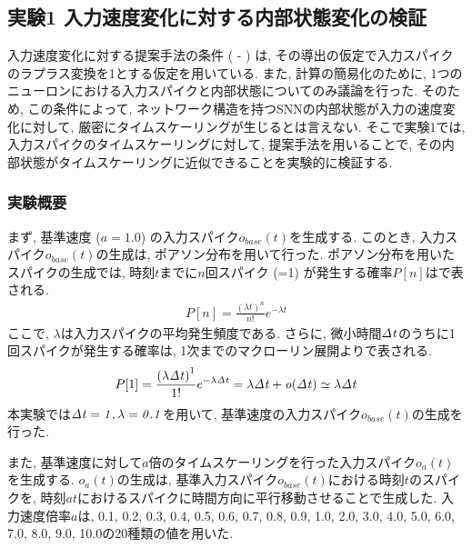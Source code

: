 \subsection{実験1 入力速度変化に対する内部状態変化の検証}

入力速度変化に対する提案手法の条件 ( - ) は, その導出の仮定で入力スパイクのラプラス変換を1とする仮定を用いている.
また, 計算の簡易化のために, 1つのニューロンにおける入力スパイクと内部状態についてのみ議論を行った.
そのため, この条件によって, ネットワーク構造を持つSNNの内部状態が入力の速度変化に対して, 厳密にタイムスケーリングが生じるとは言えない.
そこで実験1では, 入力スパイクのタイムスケーリングに対して, 提案手法を用いることで, その内部状態がタイムスケーリングに近似できることを実験的に検証する.


\subsubsection{実験概要}
まず, 基準速度 ($a=1.0$) の入力スパイク$o_{base}(t)$を生成する.
このとき, 入力スパイク$o_{base}(t)$の生成は, ポアソン分布を用いて行った.
ポアソン分布を用いたスパイクの生成では, 時刻$t$までに$n$回スパイク (=1) が発生する確率$P[n]$はで表される.
\begin{align}
    P[n] = \frac{\left(\lambda t\right)^n}{n!} e^{-\lambda t} \label{eq:poisson:distribution}
\end{align}
ここで, $\lambda$は入力スパイクの平均発生頻度である.
さらに, 微小時間$\it{\Delta} t$のうちに1回スパイクが発生する確率は, 1次までのマクローリン展開よりで表される.
\begin{align}
    P[1] = \frac{\left(\lambda \it{\Delta} t\right)^1}{1!} e^{-\lambda \it{\Delta} t} = \lambda \it{\Delta} t + o(\it{\Delta} t) \simeq \lambda \it{\Delta} t \label{eq:poisson:distribution:approximation}
\end{align}
本実験では$\it{\Delta} t = 1, \lambda=0.1$を用いて, 基準速度の入力スパイク$o_{base}(t)$の生成を行った.

また, 基準速度に対して$a$倍のタイムスケーリングを行った入力スパイク$o_a(t)$を生成する.
$o_a(t)$の生成は, 基準入力スパイク$o_{base}(t)$における時刻$t$のスパイクを, 時刻$at$におけるスパイクに時間方向に平行移動させることで生成した.
入力速度倍率$a$は, 0.1, 0.2, 0.3, 0.4, 0.5, 0.6, 0.7, 0.8, 0.9, 1.0, 2.0, 3.0, 4.0, 5.0, 6.0, 7.0, 8.0, 9.0, 10.0の20種類の値を用いた.

